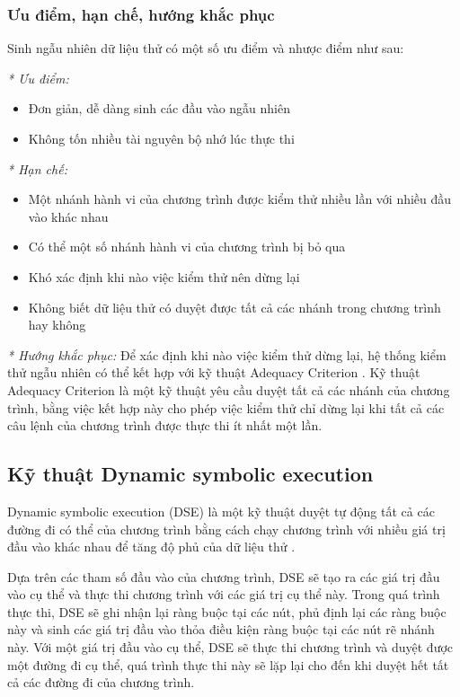 \subsubsection*{Ưu điểm, hạn chế, hướng khắc phục}
Sinh ngẫu nhiên dữ liệu thử có một số ưu điểm và nhược điểm như sau:

\textit{* Ưu điểm:}
\begin{itemize}
	\item Đơn giản, dễ dàng sinh các đầu vào ngẫu nhiên
	\item Không tốn nhiều tài nguyên bộ nhớ lúc thực thi
\end{itemize}

\textit{* Hạn chế:}
\begin{itemize}
	\item Một nhánh hành vi của chương trình được kiểm thử nhiều lần với nhiều đầu vào khác nhau
	\item Có thể một số nhánh hành vi của chương trình bị bỏ qua
	\item Khó xác định khi nào việc kiểm thử nên dừng lại
	\item Không biết dữ liệu thử có duyệt được tất cả các nhánh trong chương trình hay không
\end{itemize}

\textit{* Hướng khắc phục:}
Để xác định khi nào việc kiểm thử dừng lại, hệ thống kiểm thử ngẫu nhiên có thể kết hợp với kỹ thuật Adequacy Criterion \cite{zhu1997software}. Kỹ thuật Adequacy Criterion là một kỹ thuật yêu cầu duyệt tất cả các nhánh của chương trình, bằng việc kết hợp này cho phép việc kiểm thử chỉ dừng lại khi tất cả các câu lệnh của chương trình được thực thi ít nhất một lần.

\subsection{Kỹ thuật Dynamic symbolic execution}
Dynamic symbolic execution (DSE) là một kỹ thuật duyệt tự động tất cả các đường đi có thể của chương trình bằng cách chạy chương trình với nhiều giá trị đầu vào khác nhau để tăng độ phủ của dữ liệu thử \cite{xie2009fitness}.

Dựa trên các tham số đầu vào của chương trình, DSE sẽ tạo ra các giá trị đầu vào cụ thể và thực thi chương trình với các giá trị cụ thể này. Trong quá trình thực thi, DSE sẽ ghi nhận lại ràng buộc tại các nút, phủ định lại các ràng buộc này và sinh các giá trị đầu vào thỏa điều kiện ràng buộc tại các nút rẽ nhánh này. Với một giá trị đầu vào cụ thể, DSE sẽ thực thi chương trình và duyệt được một đường đi cụ thể, quá trình thực thi này sẽ lặp lại cho đến khi duyệt hết tất cả các đường đi của chương trình.

